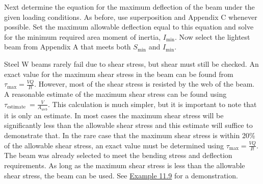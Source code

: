 \documentclass[
  letterpaper,
  DIV=11,
  numbers=noendperiod]{scrreprt}
\begin{document}
Next determine the equation for the maximum deflection of the beam under
the given loading conditions. As before, use superposition and Appendix
C whenever possible. Set the maximum allowable deflection equal to this
equation and solve for the minimum required area moment of inertia,
\(I_{\min }\). Now select the lightest beam from Appendix A that meets
both \(S_{\min }\) and \(I_{\min }\).

Steel W beams rarely fail due to shear stress, but shear must still be
checked. An exact value for the maximum shear stress in the beam can be
found from \(\tau_{\max }=\frac{V Q}{I t}\). However, most of the shear
stress is resisted by the web of the beam. A reasonable estimate of the
maximum shear stress can be found using
\(\tau_{\text {estimate }}=\frac{V}{A_{w e b}}\). This calculation is
much simpler, but it is important to note that it is only an estimate.
In most cases the maximum shear stress will be significantly less than
the allowable shear stress and this estimate will suffice to demonstrate
that. In the rare case that the maximum shear stress is within 20\% of
the allowable shear stress, an exact value must be determined using
\(\tau_{\max }=\frac{V Q}{I t}\). The beam was already selected to meet
the bending stress and deflection requirements. As long as the maximum
shear stress is less than the allowable shear stress, the beam can be
used. See \hyperref[example-11.9]{Example 11.9} for a demonstration.
\end{document}
